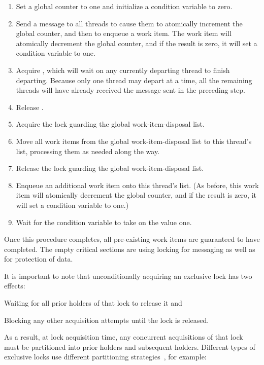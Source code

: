 {	\begin{enumerate}
	\item	Set a global counter to one and initialize a condition
		variable to zero.
	\item	Send a message to all threads to cause them to atomically
		increment the global counter, and then to enqueue a
		work item.
		The work item will atomically decrement the global
		counter, and if the result is zero, it will set a
		condition variable to one.
	\item	Acquire , which will wait on any currently departing
		thread to finish departing.
		Because only one thread may depart at a time, all the
		remaining threads will have already received the message
		sent in the preceding step.
	\item	Release .
	\item	Acquire the lock guarding the global work-item-disposal list.
	\item	Move all work items from the global work-item-disposal list
		to this thread's list, processing them as needed along the way.
	\item	Release the lock guarding the global work-item-disposal list.
	\item	Enqueue an additional work item onto this thread's list.
		(As before, this work item will atomically decrement
		the global counter, and if the result is zero, it will
		set a condition variable to one.)
	\item	Wait for the condition variable to take on the value one.
	\end{enumerate}

	Once this procedure completes, all pre-existing work items are
	guaranteed to have completed.
	The empty critical sections are using locking for messaging as
	well as for protection of data.
}\QuickQuizEnd

\QuickQuizLabel{\QlockingQemptycriticalsection}

It is important to note that unconditionally acquiring an exclusive lock
has two effects:
\begin{enumerate*}[(1)]
\item Waiting for all prior holders of that lock to release it and
\item Blocking any other acquisition attempts until the lock is released.
\end{enumerate*}
As a result, at lock acquisition time, any concurrent acquisitions of
that lock must be partitioned into prior holders and subsequent
holders.
Different types of exclusive locks use different partitioning
strategies~\cite{BjoernBrandenburgPhD,Guerraoui:2019:LPA:3319851.3301501},
for example:

